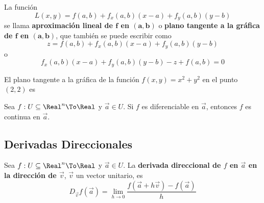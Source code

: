 \begin{frame}
  La función
  $$L(x,y)=f(a,b)+f_x(a,b)(x-a)+f_y(a,b)(y-b)$$
  se llama \textbf{aproximación lineal de $\boldsymbol{f}$ en $\boldsymbol{(a,b)}$} o \textbf{plano tangente a la gráfica de $\boldsymbol{f}$ en $\boldsymbol{(a,b)}$}, que también se puede escribir como
  $$z=f(a,b)+f_x(a,b)(x-a)+f_y(a,b)(y-b)$$
  o
  $$f_x(a,b)(x-a)+f_y(a,b)(y-b)-z+f(a,b)=0$$
\end{frame}

\begin{frame}
  \begin{eg}
    El plano tangente a la gráfica de la función $f(x,y)=x^2+y^2$ en el punto $(2,2)$ es
  \end{eg}
\end{frame}

\begin{frame}
  \begin{thm}
    Sea $f:U\subseteq\Real^n\To\Real$ y $\vec{a}\in U$. Si $f$ es diferenciable en $\vec{a}$, entonces $f$ es continua en $\vec{a}$.
  \end{thm}
\end{frame}

\subsection{Derivadas Direccionales}
\begin{frame}
\subsectionpage
\end{frame}


\begin{frame}
  \begin{defn}
    Sea $f:U\subseteq\Real^n\To\Real$ y $\vec{a}\in U$. La \textbf{derivada direccional de $f$ en $\vec{a}$ en la dirección de $\vec{v}$}, $\vec{v}$ un vector unitario, es
    $$D_{\vec{v}}f(\vec{a})=\lim_{h\to0}\dfrac{f(\vec{a}+h\vec{v})-f(\vec{a})}{h}$$
  \end{defn}
\end{frame}

